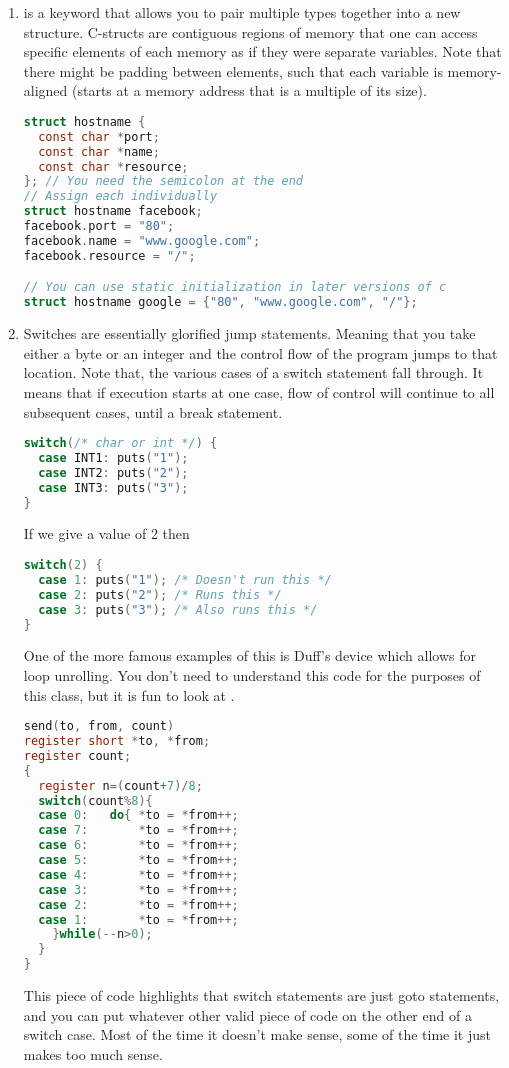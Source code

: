 \begin{enumerate}
	    \item {} is a keyword that allows you to pair multiple types together into a new structure.
        C-structs are contiguous regions of memory that one can access specific elements of each memory as if they were separate variables.
        Note that there might be padding between elements, such that each variable is memory-aligned (starts at a memory address that is a multiple of its size).

	      \begin{lstlisting}[language=C]
struct hostname {
  const char *port;
  const char *name;
  const char *resource;
}; // You need the semicolon at the end
// Assign each individually
struct hostname facebook;
facebook.port = "80";
facebook.name = "www.google.com";
facebook.resource = "/";

// You can use static initialization in later versions of c
struct hostname google = {"80", "www.google.com", "/"};
\end{lstlisting}


	    \item {} Switches are essentially glorified jump statements.
        Meaning that you take either a byte or an integer and the control flow of the program jumps to that location.
        Note that, the various cases of a switch statement fall through. It means that if execution starts at one case, flow of control will continue to all subsequent cases, until a break statement.
	      \\
	      \begin{lstlisting}[language=C]
switch(/* char or int */) {
  case INT1: puts("1");
  case INT2: puts("2");
  case INT3: puts("3");
}
\end{lstlisting}

	      If we give a value of 2 then
	      \\
	      \begin{lstlisting}[language=C]
switch(2) {
  case 1: puts("1"); /* Doesn't run this */
  case 2: puts("2"); /* Runs this */
  case 3: puts("3"); /* Also runs this */
}
\end{lstlisting}

        One of the more famous examples of this is Duff's device which allows for loop unrolling. You don't need to understand this code for the purposes of this class, but it is fun to look at \cite{duff}.

        \begin{lstlisting}[language=C]
send(to, from, count)
register short *to, *from;
register count;
{
  register n=(count+7)/8;
  switch(count%8){
  case 0:	do{	*to = *from++;
  case 7:		*to = *from++;
  case 6:		*to = *from++;
  case 5:		*to = *from++;
  case 4:		*to = *from++;
  case 3:		*to = *from++;
  case 2:		*to = *from++;
  case 1:		*to = *from++;
    }while(--n>0);
  }
}
\end{lstlisting}
        This piece of code highlights that switch statements are just goto statements, and you can put whatever other valid piece of code on the other end of a switch case.
        Most of the time it doesn't make sense, some of the time it just makes too much sense.


\end{enumerate}
